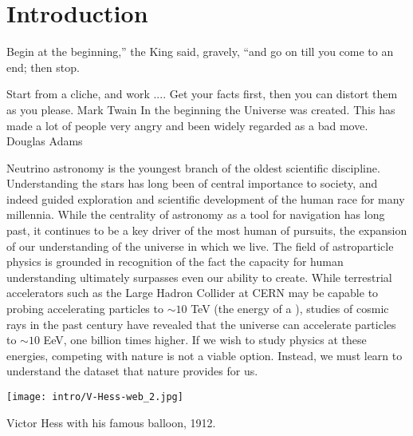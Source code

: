 \setchapterpreamble[u]{\margintoc}
\chapter{Introduction}
\begin{fquote}Begin at the beginning,'' the King said, gravely, ``and go on till you come to an end; then stop.
	
	Start from a cliche, and work ....
	Get your facts first, then you can distort them as you please. Mark Twain
	In the beginning the Universe was created. This has made a lot of people very angry and been widely regarded as a bad move. Douglas Adams
\end{fquote}

Neutrino astronomy is the youngest branch of the oldest scientific discipline. Understanding the stars has long been of central importance to society, and indeed guided exploration and scientific development of the human race for many millennia. While the centrality of astronomy as a tool for navigation has long past, it continues to be a key driver of the most human of pursuits, the expansion of our understanding of the universe in which we live. The field of astroparticle physics is grounded in recognition of the fact the capacity for human understanding ultimately surpasses even our ability to create. While terrestrial accelerators such as the Large Hadron Collider  at CERN may be capable to probing accelerating particles to $\sim 10$  TeV (the energy of a ), studies of cosmic rays in the past century have revealed that the universe  can accelerate particles to $\sim 10$  EeV, one billion times higher. If we wish to study physics at these energies, competing with nature is not a viable option. Instead, we must learn to understand the dataset that nature provides for us.

\begin{marginfigure}
	\centering \texttt{[image: intro/V-Hess-web\_2.jpg]}
	\caption{Victor Hess with his famous balloon, 1912.}
\end{marginfigure}

